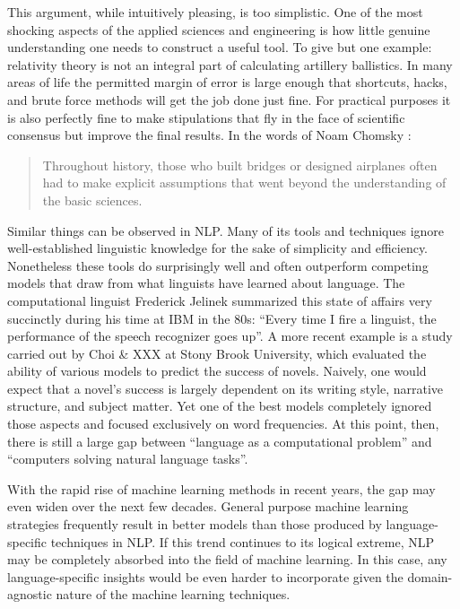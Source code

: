 This argument, while intuitively pleasing, is too simplistic.
One of the most shocking aspects of the applied sciences and engineering is how little genuine understanding one needs to construct a useful tool.
To give but one example: relativity theory is not an integral part of calculating artillery ballistics.
In many areas of life the permitted margin of error is large enough that shortcuts, hacks, and brute force methods will get the job done just fine.
For practical purposes it is also perfectly fine to make stipulations that fly in the face of scientific consensus but improve the final results.
In the words of Noam Chomsky \citep[147]{Chomsky90}:
%
\begin{quote}
    Throughout history, those who built bridges or designed airplanes often had to make explicit assumptions that went beyond the understanding of the basic sciences.
\end{quote}

Similar things can be observed in NLP\@.
Many of its tools and techniques ignore well-established linguistic knowledge for the sake of simplicity and efficiency.
Nonetheless these tools do surprisingly well and often outperform competing models that draw from what linguists have learned about language.
The computational linguist Frederick Jelinek summarized this state of affairs very succinctly during his time at IBM in the 80s: ``Every time I fire a linguist, the performance of the speech recognizer goes up''.
A more recent example is a study carried out by Choi \& XXX at Stony Brook University, which evaluated the ability of various models to predict the success of novels.
Naively, one would expect that a novel's success is largely dependent on its writing style, narrative structure, and subject matter.
Yet one of the best models completely ignored those aspects and focused exclusively on word frequencies.
At this point, then, there is still a large gap between ``language as a computational problem'' and ``computers solving natural language tasks''.

With the rapid rise of machine learning methods in recent years, the gap may even widen over the next few decades.
General purpose machine learning strategies frequently result in better models than those produced by language-specific techniques in NLP\@.
If this trend continues to its logical extreme, NLP may be completely absorbed into the field of machine learning.
In this case, any language-specific insights would be even harder to incorporate given the domain-agnostic nature of the machine learning techniques.



